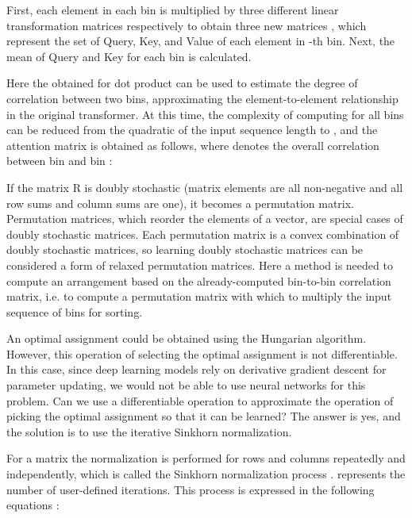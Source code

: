 \documentclass[lettersize,journal]{IEEEtran}
\begin{document}
\par  First, each element in each bin  is multiplied by three different linear transformation matrices  respectively to obtain three new matrices , which represent the set of Query, Key, and Value of each element in -th bin. Next, the mean of Query and Key  for each bin is calculated.









\par Here the obtained  for dot product can be used to estimate the degree of correlation between two bins, approximating the element-to-element relationship in the original transformer. At this time, the complexity of computing  for all bins can be reduced from the quadratic of the input sequence length  to , and the attention matrix is obtained  as follows, where  denotes the overall correlation between bin  and bin :




\par If the matrix R is doubly stochastic (matrix elements are all non-negative and all row sums and column sums are one), it becomes a permutation matrix. Permutation matrices, which reorder the elements of a vector, are special cases of doubly stochastic matrices. Each permutation matrix is a convex combination of doubly stochastic matrices, so learning doubly stochastic matrices can be considered a form of relaxed permutation matrices. Here a method is needed to compute an arrangement based on the already-computed bin-to-bin correlation matrix, i.e. to compute a permutation matrix with which to multiply the input sequence of bins for sorting.

\par An optimal assignment could be obtained using the Hungarian algorithm. However, this operation of selecting the optimal assignment is not differentiable. In this case, since deep learning models rely on derivative gradient descent for parameter updating, we would not be able to use neural networks for this problem. Can we use a differentiable operation to approximate the operation of picking the optimal assignment so that it can be learned? The answer is yes, and the solution is to use the iterative Sinkhorn normalization.

\par For a matrix  the normalization is performed for rows and columns repeatedly and independently, which is called the Sinkhorn normalization process \cite{adams2011ranking}. 
represents the number of user-defined iterations. This process is expressed in the following equations \cite{tay2020sparse}:
\end{document}
